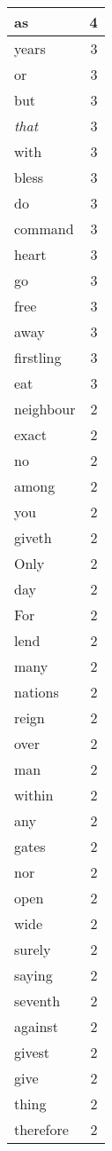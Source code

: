 \begin{center}
\begin{longtable}{l|r}
as & 4 \\ \hline
years & 3 \\ \hline
or & 3 \\ \hline
but & 3 \\ \hline
\emph{that} & 3 \\ \hline
with & 3 \\ \hline
bless & 3 \\ \hline
do & 3 \\ \hline
command & 3 \\ \hline
heart & 3 \\ \hline
go & 3 \\ \hline
free & 3 \\ \hline
away & 3 \\ \hline
firstling & 3 \\ \hline
eat & 3 \\ \hline
neighbour & 2 \\ \hline
exact & 2 \\ \hline
no & 2 \\ \hline
among & 2 \\ \hline
you & 2 \\ \hline
giveth & 2 \\ \hline
Only & 2 \\ \hline
day & 2 \\ \hline
For & 2 \\ \hline
lend & 2 \\ \hline
many & 2 \\ \hline
nations & 2 \\ \hline
reign & 2 \\ \hline
over & 2 \\ \hline
man & 2 \\ \hline
within & 2 \\ \hline
any & 2 \\ \hline
gates & 2 \\ \hline
nor & 2 \\ \hline
open & 2 \\ \hline
wide & 2 \\ \hline
surely & 2 \\ \hline
saying & 2 \\ \hline
seventh & 2 \\ \hline
against & 2 \\ \hline
givest & 2 \\ \hline
give & 2 \\ \hline
thing & 2 \\ \hline
therefore & 2 \\ \hline

\end{longtable}
\end{center}

